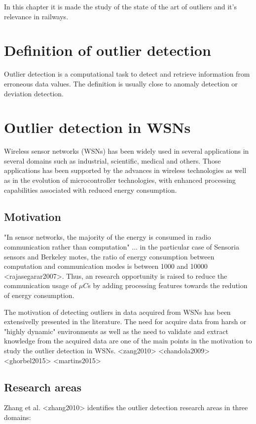 In this chapter it is  made the study of the state of the art of outliers and it's relevance in railways.


\section{Definition of outlier detection}

Outlier detection is a computational task to detect and retrieve information from erroneous data values. The definition is usually close to anomaly detection or deviation detection. 


\section{Outlier detection in WSNs}

Wireless sensor networks (WSNs) has been widely used in several applications in several domains such as industrial, scientific, medical and others. Those applications has been supported by the advances in wireless technologies as well as in the evolution of microcontroller technologies, with enhanced processing capabilities associated with reduced energy consumption.

\subsection{Motivation}

"In sensor networks, the majority of the energy is consumed in radio communication rather than computation" ... in the particular case of Sensoria sensors and Berkeley motes, the ratio of energy consumption between computation and communication modes is between 1000 and 10000 <rajasegarar2007>. Thus, an research opportunity is raised to reduce the communication usage of $\mu C$s by adding processing features towards the redution of energy consumption.

The motivation of detecting outliers in data acquired from WSNs has been extensivelly presented in the literature. The need for acquire data from harsh or "highly dynamic" environments as well as the need to validate and extract knowledge from the acquired data are one of the main points in the motivation to study the outlier detection in WSNs. <zang2010> <chandola2009> <ghorbel2015> <martins2015>  

\subsection{Research areas}
Zhang et al. <zhang2010> identifies the outlier detection research areas in three domains: 


